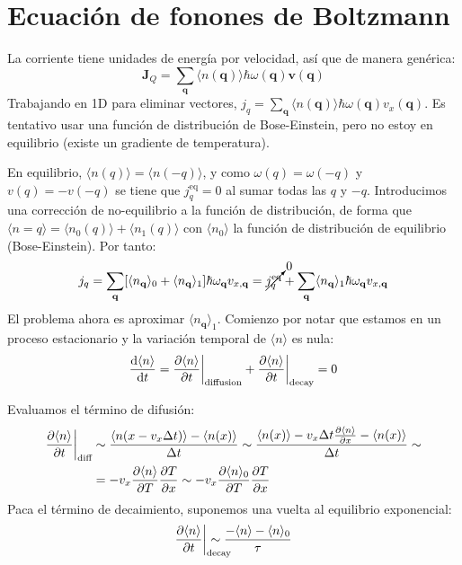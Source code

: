 \section{Ecuación de fonones de Boltzmann}
La corriente tiene unidades de energía por velocidad, así que de
manera genérica:
\begin{equation}
  \mathbf{J}_Q = \sum_{\mathbf{q}} \langle n(\mathbf{q})\rangle \hbar
  \omega(\mathbf{q}) \mathbf{v} ( \mathbf{q})
\end{equation}
Trabajando en 1D para eliminar vectores,
$j_q = \sum_{\mathbf{q}} \langle n(\mathbf{q})\rangle \hbar
\omega(\mathbf{q}) v_x(\mathbf{q})$.
Es tentativo usar una función de distribución de Bose-Einstein, pero
no estoy en equilibrio (existe un gradiente de temperatura).

En equilibrio, $\langle n(q)\rangle = \langle n(-q)\rangle$, y como
$\omega(q) = \omega(-q)$ y $v(q) = -v (-q)$ se tiene que $j_q^\text{eq} = 0$ al
sumar todas las $q$ y $-q$. Introducimos una corrección de
no-equilibrio a la función de distribución, de forma que $\langle n
=q\rangle = \langle n_0 (q)\rangle + \langle n_1 (q)\rangle$ con
$\langle n_0\rangle$ la función de distribución de equilibrio
(Bose-Einstein). Por tanto:
\begin{equation}
  j_q = \sum_{\mathbf{q}} [ \langle n _\mathbf{q}\rangle_0 + \langle
  n_\mathbf{q}\rangle_1 ] \hbar\omega_\mathbf{q} v_{x,\mathbf{q}}=
  \cancelto{0}{j_q^\text{eq}} + \sum_{\mathbf{q}} \langle n_\mathbf{q}\rangle _1\hbar\omega_\mathbf{q} v_{x,\mathbf{q}}
\end{equation}
El problema ahora es aproximar $\langle n _\mathbf{q}\rangle
_1$. Comienzo por notar que estamos en un proceso estacionario y la
variación temporal de $\langle n \rangle$ es nula:
\begin{equation}
  \label{eq:boltz1}
  \frac{\text{d}\langle n \rangle}{\text{d} t} = \frac{\partial \langle n
    \rangle}{\partial t}{}\bigg|_\text{diffusion} + \frac{\partial \langle n \rangle}{\partial t
  }{} \bigg|_\text{decay} = 0
\end{equation}

Evaluamos el término de difusión:
\begin{equation}
\begin{split}
  \frac{\partial \langle n \rangle}{\partial t} \bigg|_\text{diff} &\sim \frac{\langle n(x - v_x \Delta t
    )\rangle - \langle n (x)\rangle}{\Delta t} \sim \frac{ \langle
                                 n(x)
    \rangle  - v_x \Delta t
    \frac{\partial \langle n \rangle}{\partial x} - \langle n (x)\rangle}{\Delta t}
                                 \sim \\
                               &= -v_x \frac{\partial \langle n \rangle}{\partial T}
                                 \frac{\partial T}{\partial x} \sim -v_x \frac{\partial \langle n \rangle_0}{\partial T}
                                 \frac{\partial T}{\partial x}
\end{split}
\end{equation}
Paca el término de decaimiento, suponemos una vuelta al equilibrio
exponencial:
\begin{equation}
 \pfrac{\langle n \rangle}{t} \bigg|_{\mathrlap{\text{decay}}} \sim \frac{- \langle
   n \rangle - \langle n \rangle_0}{\tau}
\end{equation}

